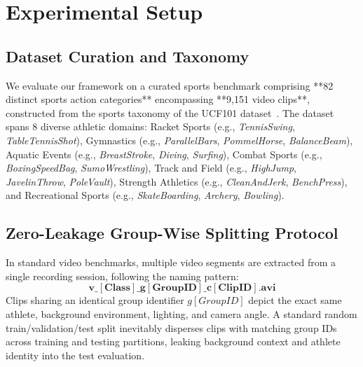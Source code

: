 \section{Experimental Setup}
\label{sec:experimental_setup}

\subsection{Dataset Curation and Taxonomy}
We evaluate our framework on a curated sports benchmark comprising **82 distinct sports action categories** encompassing **9,151 video clips**, constructed from the sports taxonomy of the UCF101 dataset~\cite{soomro2012ucf101}. The dataset spans 8 diverse athletic domains: Racket Sports (e.g., \textit{TennisSwing}, \textit{TableTennisShot}), Gymnastics (e.g., \textit{ParallelBars}, \textit{PommelHorse}, \textit{BalanceBeam}), Aquatic Events (e.g., \textit{BreastStroke}, \textit{Diving}, \textit{Surfing}), Combat Sports (e.g., \textit{BoxingSpeedBag}, \textit{SumoWrestling}), Track and Field (e.g., \textit{HighJump}, \textit{JavelinThrow}, \textit{PoleVault}), Strength Athletics (e.g., \textit{CleanAndJerk}, \textit{BenchPress}), and Recreational Sports (e.g., \textit{SkateBoarding}, \textit{Archery}, \textit{Bowling}).

\subsection{Zero-Leakage Group-Wise Splitting Protocol}
In standard video benchmarks, multiple video segments are extracted from a single recording session, following the naming pattern:
$$\mathbf{v\_[Class]\_g[GroupID]\_c[ClipID].avi}$$
Clips sharing an identical group identifier $g[GroupID]$ depict the exact same athlete, background environment, lighting, and camera angle. A standard random train/validation/test split inevitably disperses clips with matching group IDs across training and testing partitions, leaking background context and athlete identity into the test evaluation.

